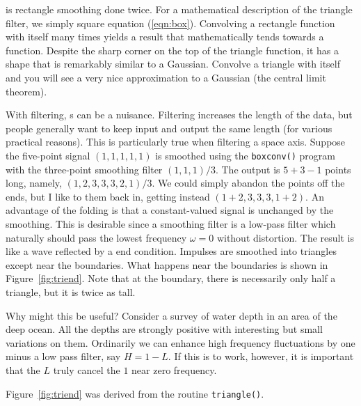 \par
{} is rectangle smoothing
done twice.  For a mathematical description of the triangle filter, we
simply square equation (\ref{eqn:box}).  Convolving a rectangle
function with itself many times yields a result that mathematically
tends towards a  function.
Despite the sharp corner on the top of the triangle function,
it has a shape that is remarkably similar to a Gaussian. 
Convolve a triangle with itself and you will see a very nice
approximation to a Gaussian (the central limit theorem).
%
\par
%
With filtering, s can be a nuisance.  Filtering
increases the length of the data, but people generally want to keep
input and output the same length (for various practical reasons).
This is particularly true when filtering a space axis.  Suppose the
five-point signal $(1, 1,1,1,1)$ is smoothed using the {\tt boxconv()}
program with the three-point smoothing filter $(1,1,1)/3$.  The output
is $5+3-1$ points long, namely, $(1,2,3,3,3,2,1)/3$.  We could simply
abandon the points off the ends, but I like to  them back in,
getting instead $(1+2,3,3,3,1+2)$.  An advantage of the folding is
that a constant-valued signal is unchanged by the smoothing.  This is
desirable since a smoothing filter is a low-pass filter which
naturally should pass the lowest frequency $\omega=0$ without
distortion.  The result is like a wave reflected by a
 end condition.  Impulses are smoothed
into triangles except near the boundaries.  What happens near the
boundaries is shown in Figure~\ref{fig:triend}.
Note that at the boundary, there is necessarily only half a triangle,
but it is twice as tall.
\par
Why might this be useful?
Consider a survey of water depth in an area of the deep ocean.
All the depths are strongly positive with interesting but small variations on them.
Ordinarily we can enhance high frequency fluctuations by one minus a low pass filter,
say $H=1-L$.  If this is to work, however, it is important
that the $L$ truly cancel the $1$ near zero frequency.
%
\par
%
Figure~\ref{fig:triend} was derived from the routine {\tt triangle()}. %
